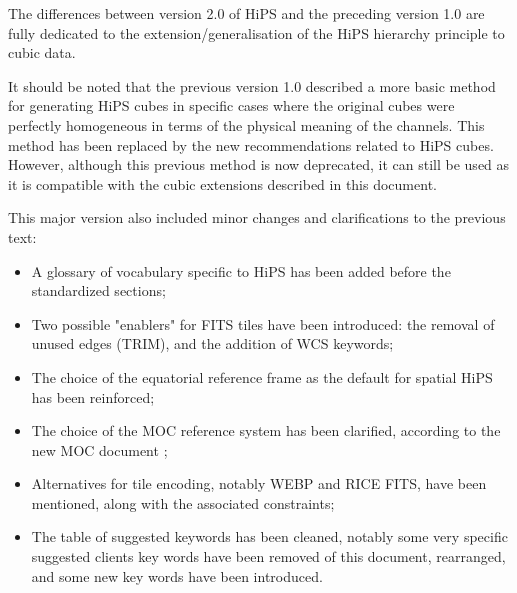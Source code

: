 \documentclass[11pt,a4paper]{ivoa}
\begin{document}

The differences between version 2.0 of HiPS and the preceding version 1.0 are fully dedicated to the extension/generalisation of the HiPS hierarchy principle to cubic data. 

It should be noted that the previous version 1.0 described a more basic method for generating HiPS cubes in specific cases where the original cubes were perfectly homogeneous in terms of the physical meaning of the channels. This method has been replaced by the new recommendations related to HiPS cubes. However, although this previous method is now deprecated, it can still be used as it is compatible with the cubic extensions described in this document.

This major version also included minor changes and clarifications to the previous text:
\begin{itemize}[noitemsep,topsep=0pt,parsep=0pt,partopsep=0pt]
   \item A glossary of vocabulary specific to HiPS has been added before the standardized sections;
   \item Two possible "enablers" for FITS tiles have been introduced: the removal of unused edges (TRIM), and the addition of WCS keywords;
   \item The choice of the equatorial reference frame as the default for spatial HiPS has been reinforced;
   \item The choice of the MOC reference system has been clarified, according to the new MOC document \citep{MOC2.1};
   \item  Alternatives for tile encoding, notably WEBP and RICE FITS, have been mentioned, along with the associated constraints;
   \item The table of suggested keywords has been cleaned, notably some very specific suggested clients key words have been removed of this document, rearranged, and some new key words have been introduced.
\end{itemize}
\end{document}
